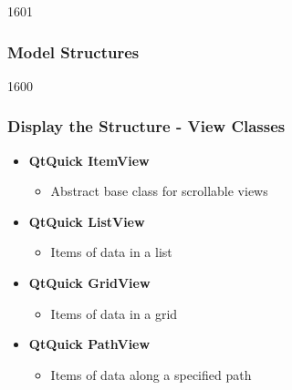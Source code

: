 \begin{slide}{1601}\frametitle{Model Structures}
\vspace*{20mm}
\end{slide}


\begin{slide}{1600}\frametitle{Display the Structure - View Classes}
\begin{itemize}
 \item \textbf{QtQuick ItemView}
   \begin{itemize}
   \item Abstract base class for scrollable views
   \end{itemize}
\item \textbf{QtQuick ListView}
  \begin{itemize}
  \item Items of data in a list
  \end{itemize}
\item \textbf{QtQuick GridView}
  \begin{itemize}
  \item Items of data in a grid
  \end{itemize}
\item \textbf{QtQuick PathView}
  \begin{itemize}
  \item Items of data along a specified path
  \end{itemize}
\end{itemize}
\end{slide}

